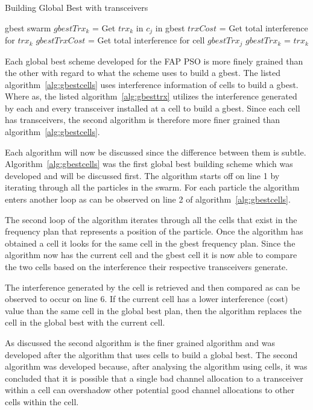 \begin{algorithm}
\caption{Building Global Best with transceivers}
\label{alg:gbesttrx}
\begin{algorithmic}[1]
\REQUIRE gbest
\REQUIRE swarm
			\STATE $gbestTrx_k$ = Get $trx_k$ in $c_j$ in gbest
			\STATE $trxCost$ = Get total interference for $trx_k$
			\STATE $gbestTrxCost$ = Get total interference for cell $gbestTrx_j$
				\STATE $gbestTrx_k$ = $trx_k$
			\ENDIF
		\ENDFOR
	\ENDFOR
\ENDFOR
\end{algorithmic}
\end{algorithm}
Each global best scheme developed for the FAP PSO is more finely grained than the other with regard to what the scheme uses to build a gbest. The listed algorithm~\ref{alg:gbestcells} uses interference information of cells to build a gbest. Where as, the listed algorithm~\ref{alg:gbesttrx} utilizes the interference generated by each and every transceiver installed at a cell to build a gbest. Since each cell has transceivers, the second algorithm is therefore more finer grained than algorithm~\ref{alg:gbestcells}.

Each algorithm will now be discussed since the difference between them is subtle. Algorithm~\ref{alg:gbestcells} was the first global best building scheme which was developed and will be discussed first. The algorithm starts off on line 1 by iterating through all the particles in the swarm. For each particle the algorithm enters another loop as can be observed on line 2 of algorithm~\ref{alg:gbestcells}.

The second loop of the algorithm iterates through all the cells that exist in the frequency plan that represents a position of the particle. Once the algorithm has obtained a cell it looks for the same cell in the gbest frequency plan. Since the algorithm now has the current cell and the gbest cell it is now able to compare the two cells based on the interference their respective transceivers generate.

The interference generated by the cell is retrieved and then compared as can be observed to occur on line 6. If the current cell has a lower interference (cost) value than the same cell in the global best plan, then the algorithm replaces the cell in the global best with the current cell.

As discussed the second algorithm is the finer grained algorithm and was developed after the algorithm that uses cells to build a global best. The second algorithm was developed because, after analysing the algorithm using cells, it was concluded that it is possible that a single bad channel allocation to a transceiver within a cell can overshadow other potential good channel allocations to other cells within the cell.

